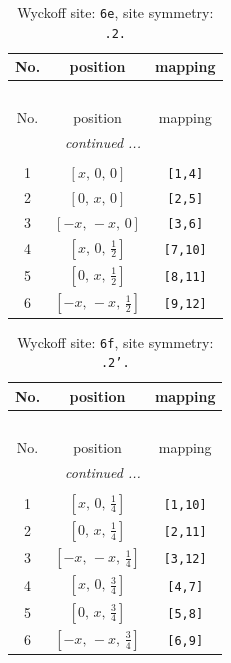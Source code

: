 \documentclass[fleqn,8pt]{jsarticle}
\begin{document}
\renewcommand{\arraystretch}{1.2}
\begin{longtable}{ccc}
\caption{Wyckoff site: {\tt 6e}, site symmetry: {\tt .2.}}
 \\
 \hline \hline
No. & position & mapping \\ \hline \endfirsthead

\multicolumn{2}{l}{\tablename\ \thetable{}} \\
 \hline \hline
No. & position & mapping \\ \hline \endhead

 \hline \hline
\multicolumn{2}{r}{\footnotesize\it continued ...} \\ \endfoot

 \hline \hline
\multicolumn{2}{r}{} \\ \endlastfoot

1 & $\left[ x,\, 0,\, 0 \right]$ & {\tt [1,4]} \\ \hline
2 & $\left[ 0,\, x,\, 0 \right]$ & {\tt [2,5]} \\ \hline
3 & $\left[ - x,\, - x,\, 0 \right]$ & {\tt [3,6]} \\ \hline
4 & $\left[ x,\, 0,\, \frac{1}{2} \right]$ & {\tt [7,10]} \\ \hline
5 & $\left[ 0,\, x,\, \frac{1}{2} \right]$ & {\tt [8,11]} \\ \hline
6 & $\left[ - x,\, - x,\, \frac{1}{2} \right]$ & {\tt [9,12]} \\
\end{longtable}
\renewcommand{\arraystretch}{1.2}
\begin{longtable}{ccc}
\caption{Wyckoff site: {\tt 6f}, site symmetry: {\tt .2'.}}
 \\
 \hline \hline
No. & position & mapping \\ \hline \endfirsthead

\multicolumn{2}{l}{\tablename\ \thetable{}} \\
 \hline \hline
No. & position & mapping \\ \hline \endhead

 \hline \hline
\multicolumn{2}{r}{\footnotesize\it continued ...} \\ \endfoot

 \hline \hline
\multicolumn{2}{r}{} \\ \endlastfoot

1 & $\left[ x,\, 0,\, \frac{1}{4} \right]$ & {\tt [1,10]} \\ \hline
2 & $\left[ 0,\, x,\, \frac{1}{4} \right]$ & {\tt [2,11]} \\ \hline
3 & $\left[ - x,\, - x,\, \frac{1}{4} \right]$ & {\tt [3,12]} \\ \hline
4 & $\left[ x,\, 0,\, \frac{3}{4} \right]$ & {\tt [4,7]} \\ \hline
5 & $\left[ 0,\, x,\, \frac{3}{4} \right]$ & {\tt [5,8]} \\ \hline
6 & $\left[ - x,\, - x,\, \frac{3}{4} \right]$ & {\tt [6,9]} \\
\end{longtable}
\end{document}
